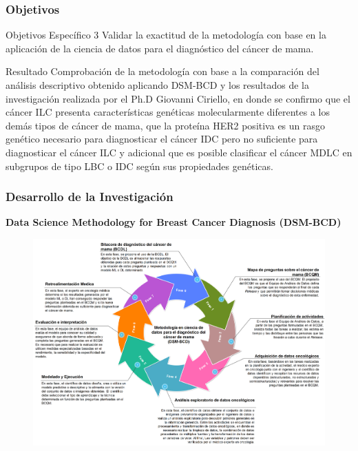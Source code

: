 \documentclass[xcolor=dvipsnames,xcolor=table,10pt]{beamer} %
\begin{document}
\begin{frame}
	\frametitle{Objetivos}
	\begin{block}{Objetivos Específico 3}\justifying
		Validar la exactitud de la metodología con base en la aplicación de la ciencia de datos para el diagnóstico del cáncer de mama.	
	\end{block}
	
	\begin{exampleblock}{Resultado}
		\justifying	
		Comprobación de la metodología con base a la comparación del análisis descriptivo obtenido aplicando DSM-BCD  y los resultados de la investigación realizada por el Ph.D Giovanni Ciriello, en donde se confirmo que el cáncer ILC presenta características genéticas molecularmente diferentes a los demás tipos de cáncer de mama, que  la proteína HER2 positiva es un rasgo genético necesario para diagnosticar el cáncer IDC pero no suficiente para diagnosticar el cáncer ILC y adicional que es posible clasificar el cáncer MDLC en subgrupos de tipo LBC o IDC según sus propiedades genéticas.
	\end{exampleblock}
\end{frame}


\begin{frame}
	\frametitle{Desarrollo de la Investigación}{\textbf{Data Science Methodology for Breast Cancer Diagnosis (DSM-BCD)}}
	\begin{figure}[h!]
		\centering
		\includegraphics[width=0.87\linewidth]{IMAGENES/DSM-BCD_SPANISH}
	\end{figure}
\end{frame}
\end{document}
